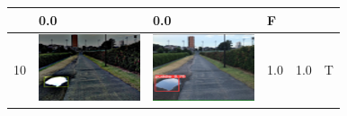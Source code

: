 \documentclass[10pt]{jarticle}
\begin{document}
\begin{table}[H]
\begin{tabular}{|l|l|l|l|l|l|}
\begin{minipage}{.1\textwidth}
           \end{minipage}       & 0.0 & 0.0 & F      \\ \hline
        10 & \begin{minipage}{.1\textwidth}
            \centering
            \includegraphics[width=0.9\linewidth]{./fig/tab10_a.png}
           \end{minipage}       & \begin{minipage}{.1\textwidth}
            \centering
            \includegraphics[width=0.9\linewidth]{./fig/tab10_r.png}
           \end{minipage}       & 1.0 & 1.0 & T      \\ \hline
        \end{tabular}
        \end{table}
\end{document}

